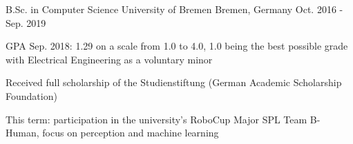 

\begin{cventries}

  \cventry
    {B.Sc. in Computer Science} %
    {University of Bremen} %
    {Bremen, Germany} %
    {Oct. 2016 - Sep. 2019} %
    {
      \begin{cvitems} %
        \item {GPA Sep. 2018: 1.29 on a scale from 1.0 to 4.0, 1.0 being the best possible grade with Electrical Engineering as a voluntary minor}
        \item {Received full scholarship of the Studienstiftung (German Academic Scholarship Foundation)}
        \item {This term: participation in the university's RoboCup Major SPL Team B-Human, focus on perception and machine learning}
      \end{cvitems}
    }
    
\begin{comment}
  \cventry
    {Abitur} %
    {Gymnasium Damme} %
    {Damme, Germany} %
    {Jul. 2007 - Jul. 2015} %
    {
      \begin{cvitems} %
        \item {GPA: 1.8 on a scale from 1.0 to 4.0, 1.0 being the best possible grade}
        \item {Scientific profile (Physics, Math, English, Geography, Computer Science)}
      \end{cvitems}
    }
\end{comment}

\end{cventries}
